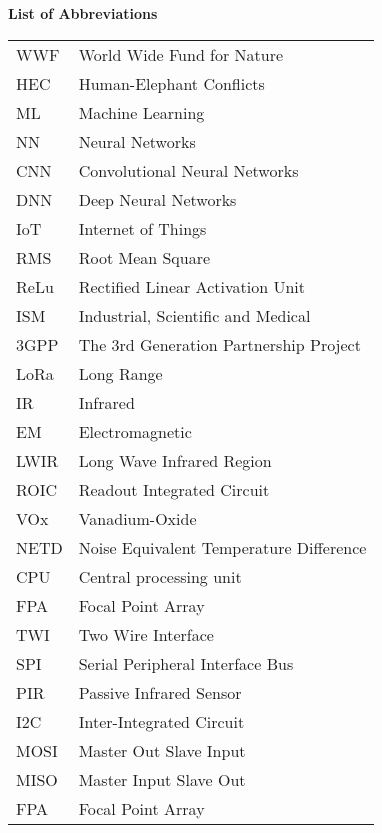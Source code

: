 \begin{poglavje}
\noindent\bfseries List of Abbreviations
\end{poglavje}
\bigskip
\bigskip
\bigskip
\bigskip
\bigskip

\begingroup
\renewcommand\arraystretch{1.3}
\begin{flushleft}
    \begin{longtable}[l]{p{2.5cm}l}
        WWF   & World Wide Fund for Nature\\
        HEC   & Human-Elephant Conflicts\\
        ML    & Machine Learning\\
        NN    & Neural Networks\\
        CNN   & Convolutional Neural Networks\\
        DNN   & Deep Neural Networks\\
        IoT   & Internet of Things\\
        RMS   & Root Mean Square\\
        ReLu  & Rectified Linear Activation Unit\\
        ISM   & Industrial, Scientific and Medical\\
        3GPP  & The 3rd Generation Partnership Project\\
        LoRa  & Long Range\\
        IR    & Infrared\\
        EM    & Electromagnetic\\
        LWIR  & Long Wave Infrared Region\\
        ROIC  & Readout Integrated Circuit\\
        VOx   & Vanadium-Oxide\\
        NETD  & Noise Equivalent Temperature Difference\\
        CPU   & Central processing unit\\
        FPA   & Focal Point Array\\
        TWI   & Two Wire Interface\\
        SPI   & Serial Peripheral Interface Bus\\
        PIR   & Passive Infrared Sensor\\
        I2C   & Inter-Integrated Circuit\\
        MOSI  & Master Out Slave Input\\
        MISO  & Master Input Slave Out \\
        FPA   & Focal Point Array\\

\end{longtable}
\end{flushleft}
